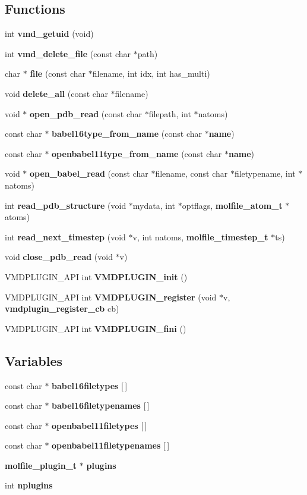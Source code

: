 \subsection*{Functions}
\begin{CompactItemize}
\item 
int {\bf vmd\_\-getuid} (void)
\item 
int {\bf vmd\_\-delete\_\-file} (const char $\ast$path)
\item 
char $\ast$ {\bf file} (const char $\ast$filename, int idx, int has\_\-multi)
\item 
void {\bf delete\_\-all} (const char $\ast$filename)
\item 
void $\ast$ {\bf open\_\-pdb\_\-read} (const char $\ast$filepath, int $\ast$natoms)
\item 
const char $\ast$ {\bf babel16type\_\-from\_\-name} (const char $\ast${\bf name})
\item 
const char $\ast$ {\bf openbabel11type\_\-from\_\-name} (const char $\ast${\bf name})
\item 
void $\ast$ {\bf open\_\-babel\_\-read} (const char $\ast$filename, const char $\ast$filetypename, int $\ast$natoms)
\item 
int {\bf read\_\-pdb\_\-structure} (void $\ast$mydata, int $\ast$optflags, {\bf molfile\_\-atom\_\-t} $\ast$atoms)
\item 
int {\bf read\_\-next\_\-timestep} (void $\ast$v, int natoms, {\bf molfile\_\-timestep\_\-t} $\ast$ts)
\item 
void {\bf close\_\-pdb\_\-read} (void $\ast$v)
\item 
VMDPLUGIN\_\-API int {\bf VMDPLUGIN\_\-init} ()
\item 
VMDPLUGIN\_\-API int {\bf VMDPLUGIN\_\-register} (void $\ast$v, {\bf vmdplugin\_\-register\_\-cb} cb)
\item 
VMDPLUGIN\_\-API int {\bf VMDPLUGIN\_\-fini} ()
\end{CompactItemize}
\subsection*{Variables}
\begin{CompactItemize}
\item 
const char $\ast$ {\bf babel16filetypes} [$\,$]
\item 
const char $\ast$ {\bf babel16filetypenames} [$\,$]
\item 
const char $\ast$ {\bf openbabel11filetypes} [$\,$]
\item 
const char $\ast$ {\bf openbabel11filetypenames} [$\,$]
\item 
{\bf molfile\_\-plugin\_\-t} $\ast$ {\bf plugins}
\item 
int {\bf nplugins}
\end{CompactItemize}


